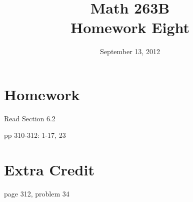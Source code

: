 \documentclass{exam}
\title{Math 263B \\ Homework Eight}
\date{September 13, 2012}
\begin{document}
\maketitle

\section{Homework}

\begin{itemize*}
  \item Read Section 6.2
  \item pp 310-312: 1-17, 23
\end{itemize*}


\section{Extra Credit}
page 312, problem 34

\ifprintanswers

\pagebreak
\end{document}
